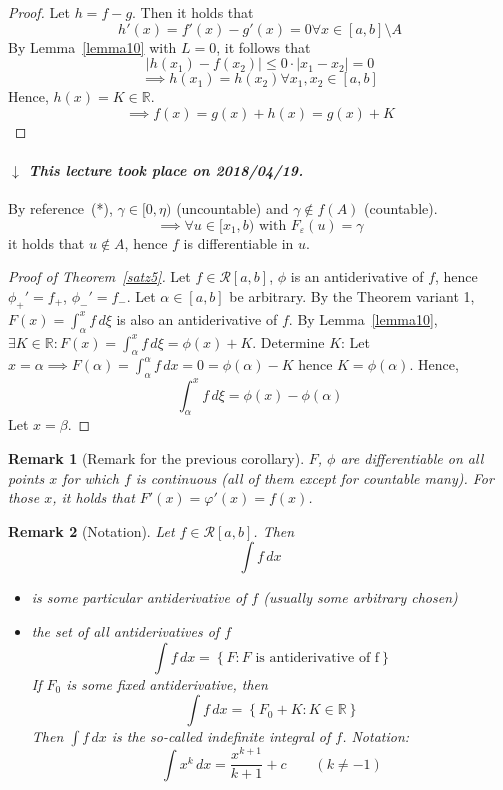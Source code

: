 \documentclass{article}
\newtheorem{remark}{Remark}  \numberwithin{remark}{section}
\newcommand{\set}[1]{\left\{#1\right\}}
\newcommand{\card}[1]{\left|#1\right|}
\newcommand{\dateref}[1]{%
  \begin{mdframed}[backgroundcolor=gray!10,innerbottommargin=0pt,innertopmargin=0pt]
    \paragraph{\textit{$\downarrow$ This lecture took place on #1.}}%
  \end{mdframed}%
}
\begin{document}
\begin{proof}
  Let $h = f - g$. Then it holds that
  \[ h'(x) = f'(x) - g'(x) = 0 \forall x \in [a,b] \setminus A \]
  By Lemma~\ref{lemma10} with $L = 0$, it follows that
  \[ \card{h(x_1) - f(x_2)} \leq 0 \cdot \card{x_1 - x_2} = 0 \]
  \[ \implies h(x_1) = h(x_2) \forall x_1, x_2 \in [a,b] \]
  Hence, $h(x) = K \in \mathbb R$.
  \[ \implies f(x) = g(x) + h(x) = g(x) + K \]
\end{proof}

\dateref{2018/04/19}

By reference~(*), $\gamma \in [0, \eta)$ (uncountable) and $\gamma \not\in f(A)$ (countable).
\[ \implies \forall u \in [x_1, b) \text{ with } F_{\varepsilon}(u) = \gamma \]
it holds that $u \not\in A$, hence $f$ is differentiable in $u$.

\begin{proof}[Proof of Theorem~\ref{satz5}]
  Let $f \in \mathcal R[a,b]$, $\phi$ is an antiderivative of $f$,
  hence $\phi_+' = f_+$, $\phi_-' = f_-$. Let $\alpha \in [a,b]$ be arbitrary.
  By the Theorem variant 1, $F(x) = \int_{\alpha}^x f \, d\xi$ is also an antiderivative of $f$.
  By Lemma~\ref{lemma10}, $\exists K \in \mathbb R: F(x) = \int_{\alpha}^x f \, d\xi = \phi(x) + K$.
  Determine $K$: Let $x = \alpha \implies F(\alpha) = \int_\alpha^\alpha f \, dx = 0 = \phi(\alpha) - K$
  hence $K = \phi(\alpha)$. Hence,
  \[ \int_\alpha^x f \, d\xi = \phi(x) - \phi(\alpha) \]
  Let $x = \beta$.
\end{proof}

\begin{remark}[Remark for the previous corollary]
  $F$, $\phi$ are differentiable on all points $x$ for which $f$ is continuous
  (all of them except for countable many).
  For those $x$, it holds that $F'(x) = \varphi'(x) = f(x)$.
\end{remark}

\begin{remark}[Notation]
  Let $f \in \mathcal R[a,b]$. Then
  \[ \int f \, dx \]
  \begin{itemize}
    \item is some particular antiderivative of $f$ (usually some arbitrary chosen)
    \item the set of \emph{all} antiderivatives of $f$
      \[ \int f \, dx = \set{F: F \text{ is antiderivative of f}} \]
      If $F_0$ is some fixed antiderivative, then
      \[ \int f \, dx = \set{F_0 + K: K \in \mathbb R} \]
      Then $\int f \, dx$ is the so-called \emph{indefinite integral of $f$}.
      Notation:
      \[ \int x^k \, dx = \frac{x^{k+1}}{k+1} + c \qquad (k \neq -1) \]
  \end{itemize}
\end{remark}
\end{document}
